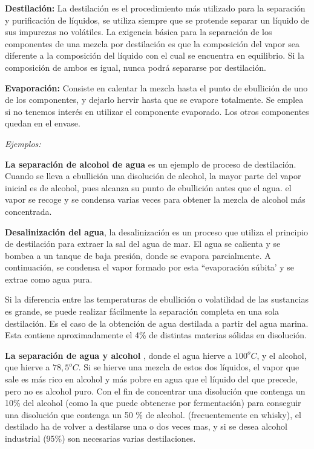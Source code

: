 \documentclass[11pt,openany]{book}
\begin{document}
\textbf{Destilación:} La destilación es el procedimiento más utilizado para la separación y purificación de 
líquidos, se utiliza siempre  que se protende separar un líquido de sus impurezas no volátiles.
La exigencia básica para la separación de los componentes de una mezcla por destilación es que la 
composición del vapor sea diferente a la composición del líquido con el cual se encuentra en equilibrio. Si 
la composición de ambos es igual, nunca podrá separarse por destilación.

\textbf{Evaporación:} Consiste en calentar la mezcla hasta el punto de ebullición de uno de los 
componentes, y dejarlo hervir hasta que se evapore totalmente. Se emplea si no tenemos interés 
en utilizar el componente evaporado. Los otros componentes quedan en el envase.

\textit{Ejemplos:}

\textbf{La separación de alcohol de agua} es un ejemplo de proceso de destilación. Cuando se lleva a ebullición 
una disolución de alcohol, la mayor parte del vapor inicial es de alcohol, pues alcanza su punto de 
ebullición antes que el agua. el vapor se recoge y se condensa varias veces para obtener la mezcla de alcohol
más concentrada.

\textbf{Desalinización del agua}, la desalinización es un proceso que utiliza el principio de destilación para 
extraer la sal del agua de mar. El agua se calienta y se bombea a un tanque de baja presión, donde 
se evapora parcialmente. A continuación, se condensa el vapor formado por esta ``evaporación súbita' y se 
extrae como agua pura.

Si la diferencia entre las temperaturas de ebullición o volatilidad de las sustancias es grande, se 
puede realizar fácilmente la separación completa en una sola destilación. Es el caso de la obtención de
agua destilada a partir del agua marina. Esta contiene aproximadamente el 4\% de distintas materias 
sólidas en disolución.

\textbf{La separación de agua y alcohol} , donde el agua hierve a $100^oC$, y el alcohol, que hierve a $78,5^oC$. Si 
se hierve una mezcla de estos dos líquidos, el vapor que sale es más rico en alcohol y más pobre en 
agua que el líquido del que precede, pero no es alcohol puro. Con el fin de concentrar una 
disolución que contenga un 10\% del alcohol (como la que puede obtenerse por fermentación) para 
conseguir una disolución que contenga un 50 \% de alcohol. (frecuentemente en whisky), el destilado ha 
de volver a destilarse una o dos veces mas, y si se desea alcohol industrial (95\%) son necesarias 
varias destilaciones.
\end{document}
